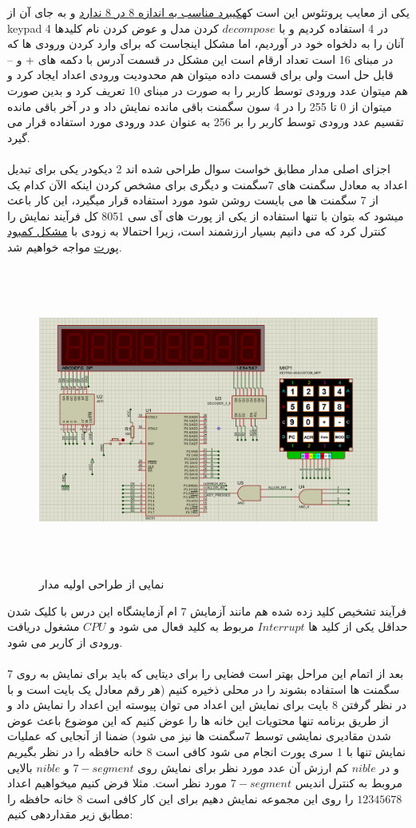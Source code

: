 \documentclass[a4paper,12pt]{article}
\begin{document}
یکی از معایب پروتئوس این است که\underline{کیبرد مناسب به اندازه 8 در 8 ندارد} و به جای آن از keypad 4 در 4 استفاده کردیم و با $decompose$ کردن مدل و عوض کردن نام کلیدها آنان را به دلخواه خود در آوردیم، اما مشکل اینجاست که برای وارد کردن ورودی ها که در مبنای 16 است تعداد ارقام است این مشکل در قسمت آدرس با دکمه های + و – قابل حل است ولی برای قسمت داده میتوان هم محدودیت ورودی اعداد ایجاد کرد و هم میتوان عدد ورودی توسط کاربر را به صورت در مبنای 10 تعریف کرد و بدین صورت میتوان از 0 تا 255 را در 4 سون سگمنت باقی مانده نمایش داد و در آخر باقی مانده تقسیم عدد ورودی توسط کاربر را بر 256 به عنوان عدد ورودی مورد استفاده قرار می گیرد.
\\
\\
اجزای اصلی مدار مطابق خواست سوال طراحی شده اند 2 دیکودر یکی برای تبدیل اعداد به معادل سگمنت های 7سگمنت و دیگری برای مشخص کردن اینکه الآن کدام یک از 7 سگمنت ها می بایست روشن شود مورد استفاده قرار میگیرد، این کار باعث میشود که بتوان با تنها استفاده از یکی از پورت های آی سی 8051 کل فرآیند نمایش را کنترل کرد که می دانیم بسیار ارزشمند است، زیرا احتمالا به زودی با \underline{مشکل کمبود پورت} مواجه خواهیم شد.
\begin{figure}[htbp]
\centerline{\includegraphics[width=6.625in, height=4in]{../Others/MAIN_CIRCUIT.PNG}}
\caption{نمایی از طراحی اولیه مدار}
\label{fig}
\end{figure}
فرآیند تشخیص کلید زده شده هم مانند آزمایش 7 ام آزمایشگاه این درس با کلیک شدن حداقل یکی از کلید ها $Interrupt$ مربوط به کلید فعال می شود و $CPU$ مشغول دریافت ورودی از کاربر می شود.
\\
\\
بعد از اتمام این مراحل بهتر است فضایی را برای دیتایی که باید برای نمایش به روی 7 سگمنت ها استفاده بشوند را در محلی ذخیره کنیم (هر رقم معادل یک بایت است و با در نظر گرفتن 8 بایت برای نمایش این اعداد می توان پیوسته این اعداد را نمایش داد و از طریق برنامه تنها محتویات این خانه ها را عوض کنیم که این موضوع باعث عوض شدن مقادیری نمایشی توسط 7سگمنت ها نیز می شود) ضمنا از آنجایی که عملیات نمایش تنها با 1 سری پورت انجام می شود کافی است 8 خانه حافظه را در نظر بگیریم و در $nible$ کم ارزش آن عدد مورد نظر برای نمایش روی $7-segment$ و $nible$ بالایی مروبط به کنترل اندیس $7-segment$ مورد نظر است. مثلا فرض کنیم میخواهیم اعداد $12345678$ را روی این مجموعه نمایش دهیم برای این کار کافی است 8 خانه حافظه را مطابق زیر مقداردهی کنیم:
\\
\end{document}
